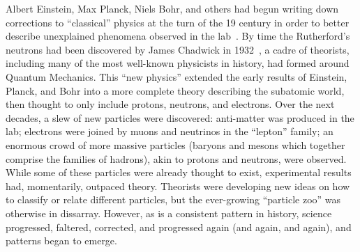 \begin{dissertationintroduction}
Albert Einstein, Max Planck, Niels Bohr, and others had begun writing down corrections to ``classical'' physics at the turn of the 19 century in order to better describe unexplained phenomena observed in the lab~\cite{EinsteinPhotoelectric, Planck, Bohr}. 
By time the Rutherford's neutrons had been discovered by James Chadwick in 1932~\cite{Chadwick1932}, a cadre of theorists, including many of the most well-known physicists in history\footnotemark{}, had formed around Quantum Mechanics.
This ``new physics'' extended the early results of Einstein, Planck, and Bohr into a more complete theory describing the subatomic world, then thought to only include protons, neutrons, and electrons. 
Over the next decades, a slew of new particles were discovered: 
anti-matter was produced in the lab; %
electrons were joined by muons and neutrinos in the ``lepton'' family; %
an enormous crowd of more massive particles (baryons and mesons which together comprise the families of hadrons), akin to protons and neutrons, were observed. %
While some of these particles were already thought to exist, experimental results had, momentarily, outpaced theory. 
Theorists were developing new ideas on how to classify or relate different particles, but the ever-growing ``particle zoo'' was otherwise in dissarray. 
However, as is a consistent pattern in history, science progressed, faltered, corrected, and progressed again (and again, and again), and patterns began to emerge. 


\end{dissertationintroduction}
